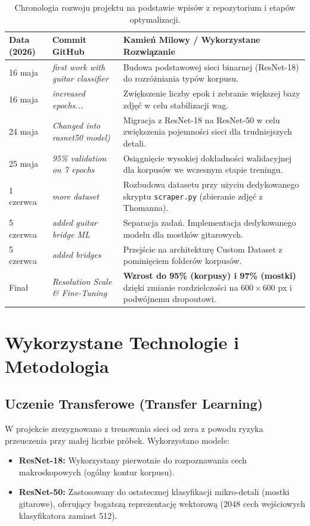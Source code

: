 \documentclass[12pt,a4paper]{article}
\begin{document}
\begin{table}[H]
    \centering
    \begin{tabular}{@{}llp{7.5cm}@{}}
    \toprule
    \textbf{Data (2026)} & \textbf{Commit GitHub} & \textbf{Kamień Milowy / Wykorzystane Rozwiązanie} \\ \midrule
    16 maja & \textit{first work with guitar classifier} & Budowa podstawowej sieci binarnej (ResNet-18) do rozróżniania typów korpusu. \\
    16 maja & \textit{increased epochs...} & Zwiększenie liczby epok i zebranie większej bazy zdjęć w celu stabilizacji wag. \\
    24 maja & \textit{Changed into rasnet50 model)} & Migracja z ResNet-18 na ResNet-50 w celu zwiększenia pojemności sieci dla trudniejszych detali. \\
    25 maja & \textit{95\% validation on 7 epochs} & Osiągnięcie wysokiej dokładności walidacyjnej dla korpusów we wczesnym etapie treningu. \\
    1 czerwca & \textit{more dataset} & Rozbudowa datasetu przy użyciu dedykowanego skryptu \texttt{scraper.py} (zbieranie zdjęć z Thomanna). \\
    5 czerwca & \textit{added guitar bridge ML} & Separacja zadań. Implementacja dedykowanego modelu dla mostków gitarowych. \\
    5 czerwca & \textit{added bridges} & Przejście na architekturę Custom Dataset z pominięciem folderów korpusów. \\
    Finał & \textit{Resolution Scale \& Fine-Tuning} & \textbf{Wzrost do 95\% (korpusy) i 97\% (mostki)} dzięki zmianie rozdzielczości na $600\times600$ px i podwójnemu dropoutowi. \\ \bottomrule
    \end{tabular}
    \caption{Chronologia rozwoju projektu na podstawie wpisów z repozytorium i etapów optymalizacji.}
    \label{tab:chronologia}
\end{table}

\section{Wykorzystane Technologie i Metodologia}

\subsection{Uczenie Transferowe (Transfer Learning)}
W projekcie zrezygnowano z trenowania sieci od zera z powodu ryzyka przeuczenia przy małej liczbie próbek. Wykorzystano modele:
\begin{itemize}
    \item \textbf{ResNet-18:} Wykorzystany pierwotnie do rozpoznawania cech makroskopowych (ogólny kontur korpusu).
    \item \textbf{ResNet-50:} Zastosowany do ostatecznej klasyfikacji mikro-detali (mostki gitarowe), oferujący bogatszą reprezentację wektorową (2048 cech wejściowych klasyfikatora zamiast 512).
\end{itemize}
\end{document}
